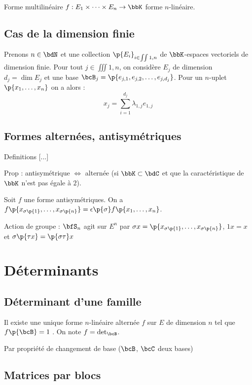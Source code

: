 \documentclass[a4paper,french,bookmarks]{book}
\begin{document}
    \begin{definition}{Forme multilinéaire}{}
        $f : E_1 \times \dots \times E_n \to \bbK$ forme $n$-linéaire.
    \end{definition}
    
    \subsection{Cas de la dimension finie}
    
    Prenons $n \in \bdN$ et une collection $\p{E_i}_{i \in \iint{1, n}}$ de $\bbK$-espaces vectoriels de dimension finie. Pour tout $j \in \iiint{1, n}$, on considère $E_j$ de dimension $d_j = \dim E_j$ et une base $\bcB_j = \p{e_{j, 1}, e_{j, 2}, \dots, e_{j, d_j}}$. Pour un $n$-uplet $\p{x_1, \dots, x_n}$ on a alors :
    \[ x_j = \sum_{i=1}^{d_j} \lambda_{1, j}e_{1, j}\]
    
    \subsection{Formes alternées, antisymétriques}
    
    Definitions [...]
    
    Prop : antisymétrique $\iff$ alternée (si $\bbK \subset \bdC$ et que la caractéristique de $\bbK$ n'est pas égale à $2$).
    
    Soit $f$ une forme antisymétriques. On a $f\p{x_{\sigma\p{1}}, \dots, x_{\sigma\p{n}}} = \epsilon\p{\sigma}f\p{x_1, \dots, x_n}$.
    
    Action de groupe : $\bfS_n$ agit sur $E^n$ par $\sigma x = \p{x_{\sigma\p{1}}, \dots, x_{\sigma\p{n}}}$, $1 x = x$ et $\sigma\p{\tau x} = \p{\sigma \tau} x$
    
    \section{Déterminants}
    
    \subsection{Déterminant d'une famille}
    
    Il existe une unique forme $n$-linéaire alternée $f$ sur $E$ de dimension $n$ tel que $f\p{\bcB} = 1$ . On note $f = \det_\bcB$.
    
    Par propriété de changement de base ($\bcB$, $\bcC$ deux bases)
    
    \subsection{Matrices par blocs}
    
\end{document}
